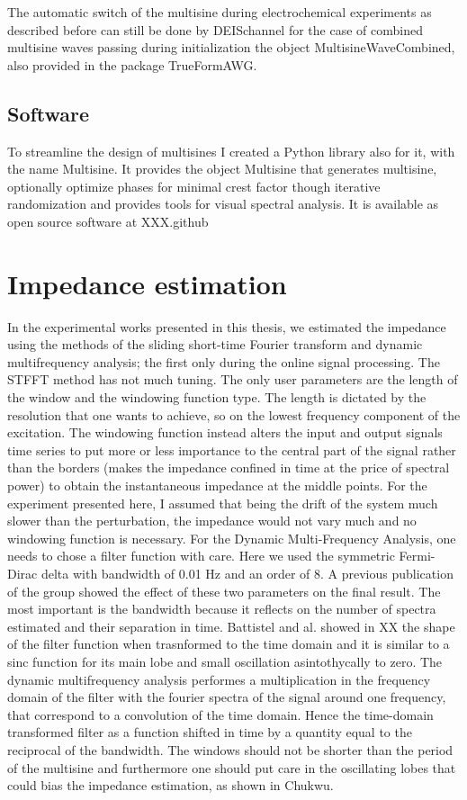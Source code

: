 The automatic switch of the multisine during electrochemical experiments as described before can still be done by DEISchannel for the case of combined multisine waves passing during initialization the object MultisineWaveCombined, also provided  in the package TrueFormAWG.

\subsection{Software}
To streamline the design of multisines I created a Python library also for it, with the name Multisine. It provides the object Multisine that generates multisine, optionally optimize phases for minimal crest factor though iterative randomization and provides tools for visual spectral analysis. It is available as open source software at XXX.github\\

\section{Impedance estimation}
In the experimental works presented in this thesis, we estimated the impedance using the methods of the sliding short-time Fourier transform and dynamic multifrequency analysis; the first only during the online signal processing. The STFFT method has not much tuning. The only user parameters are the length of the window and the windowing function type. The length is dictated by the resolution that one wants to achieve, so on the lowest frequency component of the excitation. The windowing function instead alters the input and output signals time series to put more or less importance to the central part of the signal rather than the borders (makes the impedance confined in time at the price of spectral power) to obtain the instantaneous impedance at the middle points. For the experiment presented here, I assumed that being the drift of the system much slower than the perturbation, the impedance would not vary much and no windowing function is necessary. For the Dynamic Multi-Frequency Analysis, one needs to chose a filter function with care. Here we used the symmetric Fermi-Dirac delta with bandwidth of 0.01 Hz and an order of 8. A previous publication of the group showed the effect of these two parameters on the final result. The most important is the bandwidth because it reflects on the number of spectra estimated and their separation in time. Battistel and al. showed in XX the shape of the filter function when trasnformed to the time domain and it is similar to a sinc function for its main lobe and small oscillation asintothycally to zero. The dynamic multifrequency analysis performes a multiplication in the frequency domain  of the filter with the fourier spectra of the signal around one frequency, that correspond to a convolution of the time domain. Hence the time-domain transformed filter as a function shifted in time by a quantity equal to the reciprocal of the bandwidth. The windows should not be shorter than the period of the multisine and furthermore one should put care in the oscillating lobes that could bias the impedance estimation, as shown in Chukwu.\\

